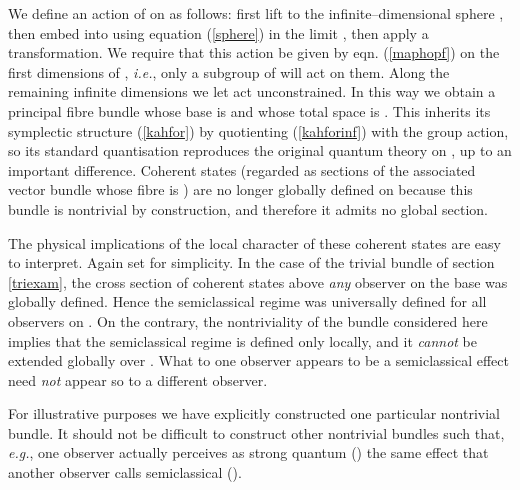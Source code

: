 \documentclass[a4paper,a4paper]{article}
\begin{document}
We define an action of \coordHE{} on \coordHE{} as follows: first lift \coordHE{} 
to the infinite--dimensional sphere \coordHE{}, then embed \coordHE{} into \coordHE{} 
using equation (\ref{sphere}) in the limit \coordHE{}, then apply a \coordHE{} transformation. 
We require that this action be given by eqn. (\ref{maphopf}) on the first \coordHE{} dimensions 
of \coordHE{}, {\it i.e.}, only a \coordHE{} subgroup of \coordHE{} will act on them. 
Along the remaining infinite dimensions we let \coordHE{} act unconstrained. 
In this way we obtain a principal \coordHE{} fibre bundle whose base \coordHE{} 
is \coordHE{} and whose total space is \coordHE{}. This \coordHE{} 
inherits its symplectic structure (\ref{kahfor}) by quotienting (\ref{kahforinf}) 
with the group action, so its standard quantisation reproduces the original 
quantum theory on \coordHE{}, up to an important difference.
Coherent states (regarded as sections of the associated 
vector bundle whose fibre is \coordHE{}) are no longer globally defined on \coordHE{} 
because this bundle is nontrivial by construction, and therefore it admits no global section. 

The physical implications of the local character of these coherent states
are easy to interpret. Again set \coordHE{} for simplicity. In the case of the trivial 
bundle of section \ref{triexam}, the cross section of coherent states above {\it any}
observer on the base \coordHE{} was globally defined. Hence the semiclassical 
regime was universally defined for all observers on \coordHE{}. On the 
contrary, the nontriviality of the bundle considered here 
implies that the semiclassical regime is defined only locally, and it 
{\it cannot} be extended globally over \coordHE{}. What to one observer  
appears to be a semiclassical effect  need {\it not} appear so to a different observer. 

For illustrative purposes we have explicitly constructed one particular nontrivial bundle. 
It should not be difficult to construct other nontrivial bundles such that, 
{\it e.g.}, one observer actually perceives as strong quantum (\coordHE{}) 
the same effect that another observer calls semiclassical (\coordHE{}). 
\end{document}
